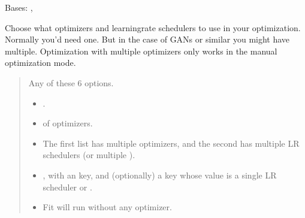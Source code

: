 \documentclass[letterpaper,10pt,english]{sphinxmanual}
\begin{document}
\begin{fulllineitems}
\label{\detokenize{train:train.PcrCNN}}
\pysigstartsignatures
\pysiglinewithargsret
{}
{\sphinxparamcomma {}}
{}
\pysigstopsignatures
\sphinxAtStartPar
Bases: , 

\begin{fulllineitems}
\label{\detokenize{train:train.PcrCNN.configure_optimizers}}
\pysigstartsignatures
\pysiglinewithargsret
{}
{}
{}
\pysigstopsignatures
\sphinxAtStartPar
Choose what optimizers and learning\sphinxhyphen{}rate schedulers to use in your optimization. Normally you’d need one.
But in the case of GANs or similar you might have multiple. Optimization with multiple optimizers only works in
the manual optimization mode.
\begin{quote}\begin{description}
\sphinxAtStartPar

\sphinxAtStartPar
Any of these 6 options.
\begin{itemize}
\item {} 
\sphinxAtStartPar
{}.

\item {} 
\sphinxAtStartPar
{} of optimizers.

\item {} 
\sphinxAtStartPar
{} \sphinxhyphen{} The first list has multiple optimizers, and the second has multiple LR schedulers
(or multiple ).

\item {} 
\sphinxAtStartPar
{}, with an  key, and (optionally) a 
key whose value is a single LR scheduler or .

\item {} 
\sphinxAtStartPar
{} \sphinxhyphen{} Fit will run without any optimizer.


\end{itemize}
\end{description}
\end{quote}
\end{fulllineitems}
\end{fulllineitems}
\end{document}
